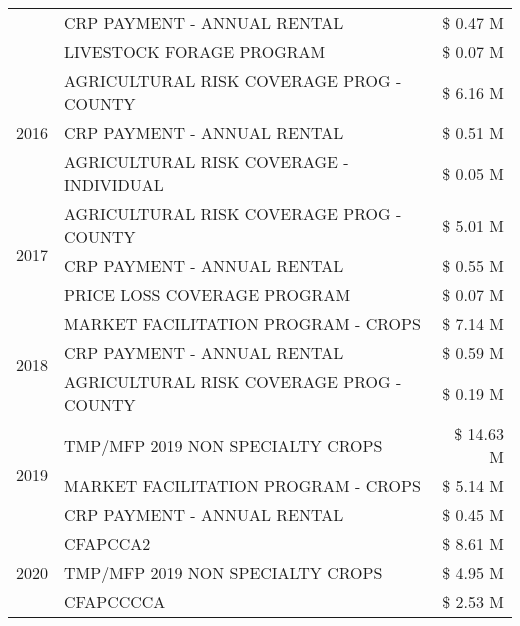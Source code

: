 \begin{tabular}{llr}
 & CRP PAYMENT - ANNUAL RENTAL & \$ 0.47 M \\
 & LIVESTOCK FORAGE PROGRAM & \$ 0.07 M \\
\cline{1-3}
\multirow[t]{3}{*}{2016} & AGRICULTURAL RISK COVERAGE PROG - COUNTY & \$ 6.16 M \\
 & CRP PAYMENT - ANNUAL RENTAL & \$ 0.51 M \\
 & AGRICULTURAL RISK COVERAGE - INDIVIDUAL & \$ 0.05 M \\
\cline{1-3}
\multirow[t]{3}{*}{2017} & AGRICULTURAL RISK COVERAGE PROG - COUNTY & \$ 5.01 M \\
 & CRP PAYMENT - ANNUAL RENTAL & \$ 0.55 M \\
 & PRICE LOSS COVERAGE PROGRAM & \$ 0.07 M \\
\cline{1-3}
\multirow[t]{3}{*}{2018} & MARKET FACILITATION PROGRAM - CROPS & \$ 7.14 M \\
 & CRP PAYMENT - ANNUAL RENTAL & \$ 0.59 M \\
 & AGRICULTURAL RISK COVERAGE PROG - COUNTY & \$ 0.19 M \\
\cline{1-3}
\multirow[t]{3}{*}{2019} & TMP/MFP 2019 NON SPECIALTY CROPS & \$ 14.63 M \\
 & MARKET FACILITATION PROGRAM - CROPS & \$ 5.14 M \\
 & CRP PAYMENT - ANNUAL RENTAL & \$ 0.45 M \\
\cline{1-3}
\multirow[t]{3}{*}{2020} & CFAPCCA2 & \$ 8.61 M \\
 & TMP/MFP 2019 NON SPECIALTY CROPS & \$ 4.95 M \\
 & CFAPCCCCA & \$ 2.53 M \\
\cline{1-3}
\bottomrule
\end{tabular}
